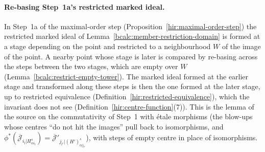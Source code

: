 \paragraph{Re-basing Step~1a's restricted marked ideal.} In Step~1a of the maximal-order step (Proposition~\ref{hir:maximal-order-step}) the restricted
marked ideal of Lemma~\ref{bcalc:member-restriction-domain} is formed at a stage depending on the point and restricted to a neighbourhood \(W\) of the image
of the point. A nearby point whose stage is later is compared by re-basing across the steps between the two stages, which are empty over \(W\)
(Lemma~\ref{bcalc:restrict-empty-tower}). The marked ideal formed at the earlier stage and transformed along these steps is then the one formed at the later
stage, up to restricted equivalence (Definition~\ref{hir:restricted-equivalence}), which the invariant does not see (Definition~\ref{hir:centre-function}(7)).
This is the lemma of the source on the commutativity of Step~1 with étale morphisms (the blow-ups whose centres ``do not hit the images'' pull
back to isomorphisms, and \(\phi^*(\overline{\mathcal J}_{i_l|H^s_{\alpha i_l}})=\overline{\mathcal J}'_{j_{l'}|(H')^s_{\alpha j_{l'}}}\)), with steps of empty centre in place of
isomorphisms.

